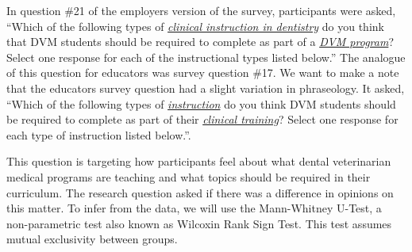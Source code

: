 \documentclass[
  11pt,
  letterpaper,
  DIV=11,
  numbers=noendperiod]{scrartcl}
\numberwithin{figure}{section}
\begin{document}
In question \#21 of the employers version of the survey, participants
were asked, ``Which of the following types of \ul{\emph{clinical
instruction in dentistry}} do you think that DVM students should be
required to complete as part of a \ul{\emph{DVM program}}? Select one
response for each of the instructional types listed below.'' The
analogue of this question for educators was survey question \#17. We
want to make a note that the educators survey question had a slight
variation in phraseology. It asked, ``Which of the following types of
\ul{\emph{instruction}} do you think DVM students should be required to
complete as part of their \ul{\emph{clinical training}}? Select one
response for each type of instruction listed below.''.

This question is targeting how participants feel about what dental
veterinarian medical programs are teaching and what topics should be
required in their curriculum. The research question asked if there was a
difference in opinions on this matter. To infer from the data, we will
use the Mann-Whitney U-Test, a non-parametric test also known as
Wilcoxin Rank Sign Test. This test assumes mutual exclusivity between
groups.
\end{document}
